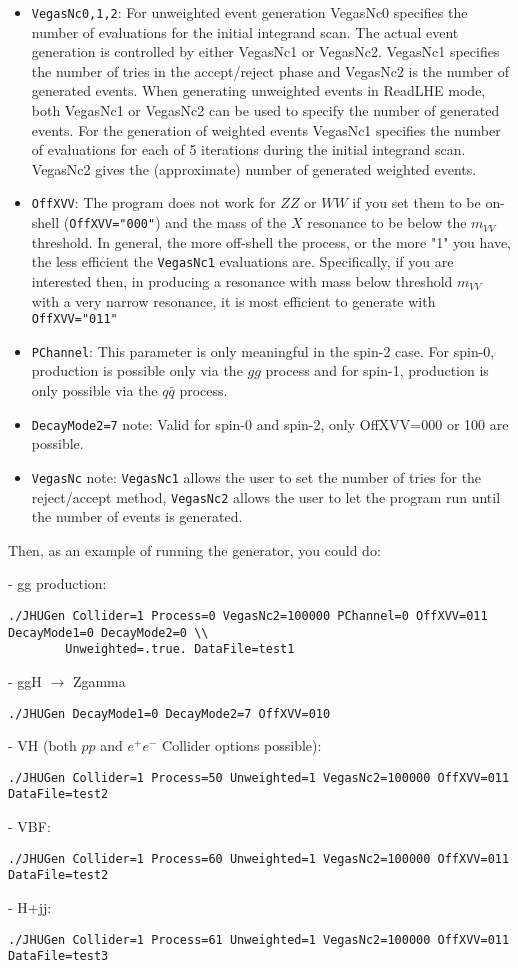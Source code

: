 \documentclass[aps,superscriptaddress,nofootinbib]{revtex4}
\begin{document}
\begin{itemize}
\item {\verb|VegasNc0,1,2|}: For unweighted event generation VegasNc0 specifies the number of evaluations for the initial integrand scan.  The actual event generation is controlled by either VegasNc1 or VegasNc2. VegasNc1 specifies the number of tries in the accept/reject phase and VegasNc2 is the number of generated events. When generating unweighted events in ReadLHE mode, both VegasNc1 or VegasNc2 can be used to specify the number of generated events. For the generation of weighted events VegasNc1 specifies the number of evaluations for each of 5 iterations during the initial integrand scan. VegasNc2 gives the (approximate) number of generated weighted events.
\item {\verb|OffXVV|}: The program does not work for $ZZ$ or $WW$ if you set them to be on-shell (\verb|OffXVV="000"|) and the mass of the $X$ resonance to be below the $m_{VV}$ threshold.  In general, the more off-shell the process, or the more "1" you have, the less efficient the \verb|VegasNc1| evaluations are.  Specifically, if you are interested then, in producing a resonance with mass below threshold $m_{VV}$ with a very narrow resonance, it is most efficient to generate with \verb|OffXVV="011"|
\item \verb|PChannel|: This parameter is only meaningful in the spin-2 case.  For spin-0, production is possible only via the $gg$ process and for spin-1, production is only possible via the $q\bar{q}$ process.
\item \verb|DecayMode2=7| note: Valid for spin-0 and spin-2, only OffXVV=000 or 100 are possible.  
\item \verb|VegasNc| note: \verb|VegasNc1| allows the user to set the number of tries for the reject/accept method, \verb|VegasNc2| allows the user to let the program run until the number of events is generated.
\end{itemize}

\noindent
Then, as an example of running the generator, you could do:

\noindent
- gg production:
\begin{verbatim}
./JHUGen Collider=1 Process=0 VegasNc2=100000 PChannel=0 OffXVV=011 DecayMode1=0 DecayMode2=0 \\
		Unweighted=.true. DataFile=test1
\end{verbatim}
- ggH $\to$ Zgamma
\begin{verbatim}
./JHUGen DecayMode1=0 DecayMode2=7 OffXVV=010
\end{verbatim}
- VH (both $pp$ and $e^+e^-$ Collider options possible):
\begin{verbatim}
./JHUGen Collider=1 Process=50 Unweighted=1 VegasNc2=100000 OffXVV=011 DataFile=test2 
\end{verbatim}
- VBF:
\begin{verbatim}
./JHUGen Collider=1 Process=60 Unweighted=1 VegasNc2=100000 OffXVV=011 DataFile=test2 
\end{verbatim}
- H+jj:
\begin{verbatim}
./JHUGen Collider=1 Process=61 Unweighted=1 VegasNc2=100000 OffXVV=011 DataFile=test3
\end{verbatim}
\end{document}
